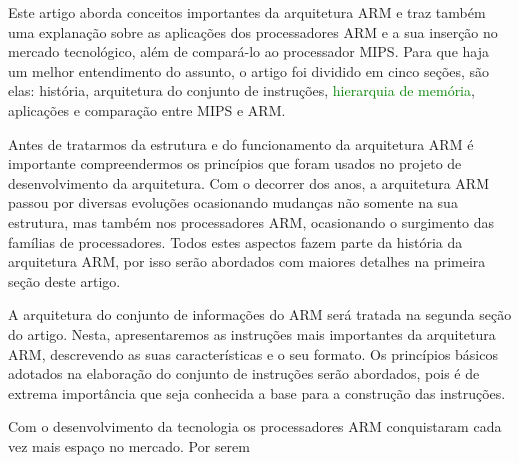 \documentclass[12pt]{article}
\begin{document}
Este artigo aborda conceitos importantes da arquitetura ARM e traz também uma explanação sobre as aplicações dos processadores ARM e a sua inserção no mercado tecnológico, além de compará-lo ao processador MIPS. Para que haja um melhor entendimento do assunto, o artigo foi dividido em cinco seções, são elas: história, arquitetura do conjunto de instruções, \textcolor{green}{hierarquia de memória}, aplicações e comparação entre MIPS e ARM.

Antes de tratarmos da estrutura e do funcionamento da arquitetura ARM é importante compreendermos os princípios que foram usados no projeto de desenvolvimento da arquitetura. Com o decorrer dos anos, a arquitetura ARM passou por diversas evoluções ocasionando mudanças não somente na sua estrutura, mas também nos processadores ARM, ocasionando o surgimento das famílias de processadores. Todos estes aspectos fazem parte da história da arquitetura ARM, por isso serão abordados com maiores detalhes na primeira seção deste artigo.

A arquitetura do conjunto de informações do ARM será tratada na segunda seção do artigo. Nesta, apresentaremos as instruções mais importantes da arquitetura ARM, descrevendo as suas características e o seu formato. Os princípios básicos adotados na elaboração do conjunto de instruções serão abordados, pois é de extrema importância que seja conhecida a base para a construção das instruções.

Com o desenvolvimento da tecnologia os processadores ARM conquistaram cada vez mais espaço no mercado. Por serem  





\end{document}
